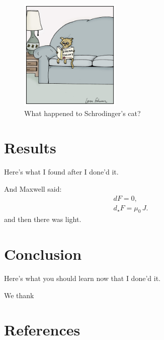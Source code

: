 \documentclass[aps,prd,amsmath,floats,floatfix, twocolumn,
superscriptaddress,nofootinbib,showpacs,longbibliography]{revtex4-1}
\begin{document}
\begin{figure}[thb]
\includegraphics[width=0.43\textwidth]{string_cat.jpeg}
\caption{
What happened to Schrodinger's cat?
}
\label{fig:strings}
\end{figure}

\section{Results}
\label{sec:results}
Here's what I found after I done'd it. \cite{Abbott:2016nmj}

And Maxwell said:
\begin{gather}
    dF = 0, \\
    d_{\star}F = \mu_0 \, J.
\label{eq:doppler_mass}
\end{gather}
and then there was light.


\section{Conclusion}
\label{sec:conclusion}
Here's what you should learn now that I done'd it.


\begin{acknowledgments}
We thank
\end{acknowledgments}  

\section*{References}

\end{document}
